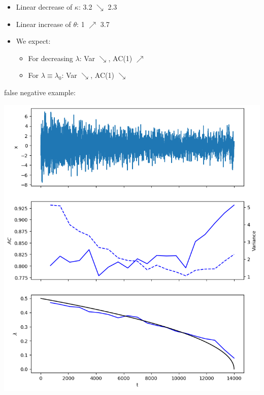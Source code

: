 \documentclass[%
thesis=student,%
coverpage=false,%
titlepage=false,%
headmarks=true, %
german,%
font=libertine, %
math=newpxtx, %
BCOR=5mm,%
coverBCOR=11mm%
]{tumbook}
\begin{document}
\begin{itemize}
    \item Linear decrease of $\kappa$: 3.2 $\searrow$ 2.3 
    \item Linear increase of $\theta$: 1 $\nearrow$ 3.7
    \item We expect: 
    \begin{itemize}
        \item For decreasing $\lambda$: Var $\searrow$, AC(1) $\nearrow$
        \item For $\lambda \equiv \lambda_{0}$: Var $\searrow$, AC(1) $\searrow$
    \end{itemize}
\end{itemize}


false negative example:

\begin{minipage}{0.49\textwidth}
        \centering
        \includegraphics[width=\textwidth]{figures/false_negative_var.png}
    \end{minipage}
    \hfill
\end{document}

